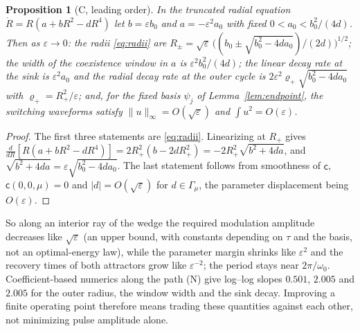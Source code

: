 \documentclass[11pt,a4paper]{article}
\theoremstyle{plain}
\newtheorem{proposition}[theorem]{Proposition}
\theoremstyle{definition}
\theoremstyle{remark}
\newcommand{\norm}[1]{\lVert#1\rVert}
\newcommand{\abs}[1]{\lvert#1\rvert}
\newcommand{\evC}{\textsf{C}}
\newcommand{\evN}{\textsf{N}}
\begin{document}
\begin{proposition}[\evC, leading order]\label{prop:tradeoff}
In the truncated radial equation $\dot R=R(a+bR^2-dR^4)$ let $b=\varepsilon b_0$ and $a=-\varepsilon^2a_0$ with fixed $0<a_0<b_0^2/(4d)$. Then as $\varepsilon\to0$: the radii \eqref{eq:radii} are $R_\pm=\sqrt\varepsilon\,\bigl((b_0\pm\sqrt{b_0^2-4da_0})/(2d)\bigr)^{1/2}$; the width of the coexistence window in $a$ is $\varepsilon^2b_0^2/(4d)$; the linear decay rate at the sink is $\varepsilon^2a_0$ and the radial decay rate at the outer cycle is $2\varepsilon^2\varrho_+\sqrt{b_0^2-4da_0}$ with $\varrho_+=R_+^2/\varepsilon$; and, for the fixed basis $\psi_j$ of Lemma~\ref{lem:endpoint}, the switching waveforms satisfy $\norm u_\infty=O(\sqrt\varepsilon)$ and $\int u^2=O(\varepsilon)$.
\end{proposition}
\begin{proof}
The first three statements are \eqref{eq:radii}. Linearizing at $R_+$ gives $\frac{d}{dR}[R(a+bR^2-dR^4)]=2R_+^2(b-2dR_+^2)=-2R_+^2\sqrt{b^2+4da}$, and $\sqrt{b^2+4da}=\varepsilon\sqrt{b_0^2-4da_0}$. The last statement follows from smoothness of $\mathsf c$, $\mathsf c(0,0,\mu)=0$ and $\abs d=O(\sqrt\varepsilon)$ for $d\in\Gamma_\mu$, the parameter displacement being $O(\varepsilon)$.
\end{proof}
So along an interior ray of the wedge the required modulation amplitude decreases like $\sqrt\varepsilon$ (an upper bound, with constants depending on $\tau$ and the basis, not an optimal-energy law), while the parameter margin shrinks like $\varepsilon^2$ and the recovery times of both attractors grow like $\varepsilon^{-2}$; the period stays near $2\pi/\omega_0$. Coefficient-based numerics along the path (\evN) give log--log slopes $0.501$, $2.005$ and $2.005$ for the outer radius, the window width and the sink decay. Improving a finite operating point therefore means trading these quantities against each other, not minimizing pulse amplitude alone.
\end{document}
